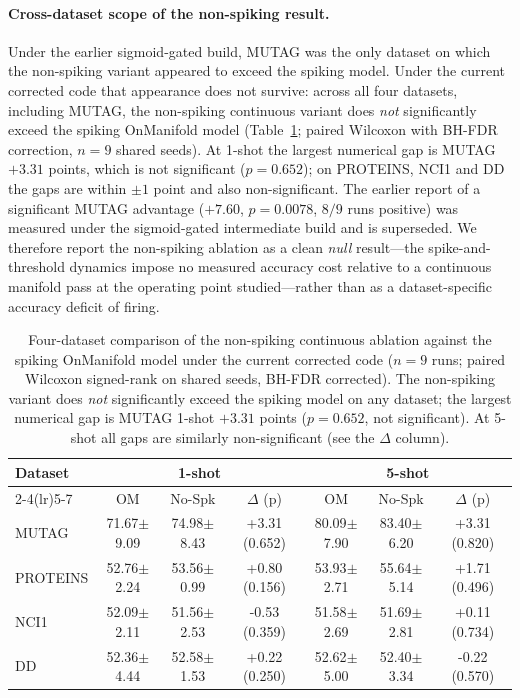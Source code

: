 \documentclass[a4paper,fleqn]{cas-dc}
\begin{document}
\paragraph{Cross-dataset scope of the non-spiking result.} Under the earlier sigmoid-gated build, MUTAG was the only dataset on which the non-spiking variant appeared to exceed the spiking model. Under the current corrected code that appearance does not survive: across all four datasets, including MUTAG, the non-spiking continuous variant does \emph{not} significantly exceed the spiking OnManifold model (Table~\ref{tab:nospike_scope}; paired Wilcoxon with BH-FDR correction, $n{=}9$ shared seeds). At 1-shot the largest numerical gap is MUTAG $+3.31$ points, which is not significant ($p{=}0.652$); on PROTEINS, NCI1 and DD the gaps are within $\pm1$ point and also non-significant. The earlier report of a significant MUTAG advantage ($+7.60$, $p{=}0.0078$, $8/9$ runs positive) was measured under the sigmoid-gated intermediate build and is superseded. We therefore report the non-spiking ablation as a clean \emph{null} result---the spike-and-threshold dynamics impose no measured accuracy cost relative to a continuous manifold pass at the operating point studied---rather than as a dataset-specific accuracy deficit of firing.

\begin{table}[t]
\centering\footnotesize
\caption{Four-dataset comparison of the non-spiking continuous ablation against the spiking OnManifold model under the current corrected code ($n{=}9$ runs; paired Wilcoxon signed-rank on shared seeds, BH-FDR corrected). The non-spiking variant does \emph{not} significantly exceed the spiking model on any dataset; the largest numerical gap is MUTAG 1-shot $+3.31$ points ($p{=}0.652$, not significant). At 5-shot all gaps are similarly non-significant (see the $\Delta$ column).}
\label{tab:nospike_scope}
\begin{tabular}{@{}lcccccc@{}}
\toprule
Dataset & \multicolumn{3}{c}{1-shot} & \multicolumn{3}{c}{5-shot} \\
\cmidrule(lr){2-4}\cmidrule(lr){5-7}
 & OM & No-Spk & $\Delta$ (p) & OM & No-Spk & $\Delta$ (p) \\
\midrule
    MUTAG & 71.67$\pm$9.09 & 74.98$\pm$8.43 & +3.31 (0.652) & 80.09$\pm$7.90 & 83.40$\pm$6.20 & +3.31 (0.820) \\
    PROTEINS & 52.76$\pm$2.24 & 53.56$\pm$0.99 & +0.80 (0.156) & 53.93$\pm$2.71 & 55.64$\pm$5.14 & +1.71 (0.496) \\
    NCI1 & 52.09$\pm$2.11 & 51.56$\pm$2.53 & -0.53 (0.359) & 51.58$\pm$2.69 & 51.69$\pm$2.81 & +0.11 (0.734) \\
    DD & 52.36$\pm$4.44 & 52.58$\pm$1.53 & +0.22 (0.250) & 52.62$\pm$5.00 & 52.40$\pm$3.34 & -0.22 (0.570) \\
\bottomrule
\end{tabular}
\end{table}
\end{document}
